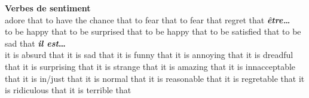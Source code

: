 {\sffamily\bfseries Verbes de sentiment}\\
   {adore that}
   {to have the chance that}
   {to fear that}
   {to fear that}
   {regret that}
     {\bf {\em être\ldots}}\\
   {to be happy that}
   {to be surprised that}
   {to be happy that}
   {to be satisfied that}
   {to be sad that}
     {\bf {\em il est}\ldots}\\
        {it is absurd that}
        {it is sad that}
        {it is funny that}
        {it is annoying that}
        {it is dreadful that}
        {it is surprising that}
        {it is strange that}
        {it is amazing that}
        {it is innacceptable that}
        {it is in/just that}
        {it is normal that}
        {it is reasonable that}
        {it is regretable that}
        {it is ridiculous that}
        {it is terrible that}
